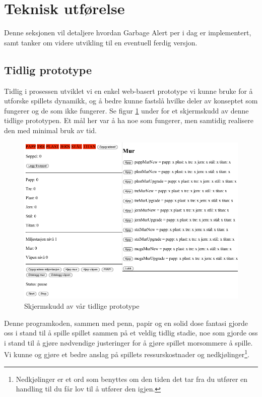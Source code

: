 \section{Teknisk utførelse}\label{sec:teknisk}
Denne seksjonen vil detaljere hvordan Garbage Alert per i dag er implementert, samt tanker om videre utvikling til en eventuell ferdig versjon.


\subsection{Tidlig prototype}
Tidlig i prosessen utviklet vi en enkel web-basert prototype vi kunne bruke for å utforske spillets dynamikk, og å bedre kunne fastslå hvilke deler av konseptet som fungerer og de som ikke fungerer. Se figur \ref{fig:screenshot_tidlig_prototype} under for et skjermskudd av denne tidlige prototypen. Et mål her var å ha noe som fungerer, men samtidig realisere den med minimal bruk av tid.

\begin{figure} [H]
	\begin{center}
	\includegraphics[scale=0.5]{images/screenshot_tidlig_prototype.png}
	\end{center}
	\caption{Skjermskudd av vår tidlige prototype}
	\label{fig:screenshot_tidlig_prototype}
\end{figure}

Denne programkoden, sammen med penn, papir og en solid dose fantasi gjorde oss i stand til å spille spillet sammen på et veldig tidlig stadie, noe som gjorde oss i stand til å gjøre nødvendige justeringer for å gjøre spillet morsommere å spille. Vi kunne og gjøre et bedre anslag på spillets ressurskostnader og nedkjølinger\footnote{Nedkjølinger er et ord som benyttes om den tiden det tar fra du utfører en handling til du får lov til å utfører den igjen.}.

